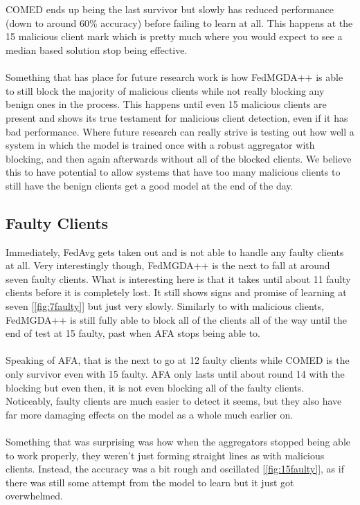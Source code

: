 \\ \\
COMED ends up being the last survivor but slowly has reduced performance (down to around 60\% accuracy) before failing to learn at all.
This happens at the 15 malicious client mark which is pretty much where you would expect to see a median based solution stop being effective.
\\ \\
Something that has place for future research work is how FedMGDA++ is able to still block the majority of malicious clients while not really blocking any benign ones in the process.
This happens until even 15 malicious clients are present and shows its true testament for malicious client detection, even if it has bad performance.
Where future research can really strive is testing out how well a system in which the model is trained once with a robust aggregator with blocking, and then again afterwards without all of the blocked clients.
We believe this to have potential to allow systems that have too many malicious clients to still have the benign clients get a good model at the end of the day.


\subsection{Faulty Clients}
Immediately, FedAvg gets taken out and is not able to handle any faulty clients at all.
Very interestingly though, FedMGDA++ is the next to fall at around seven faulty clients.
What is interesting here is that it takes until about 11 faulty clients before it is completely lost.
It still shows signs and promise of learning at seven [\ref{fig:7faulty}] but just very slowly.
Similarly to with malicious clients, FedMGDA++ is still fully able to block all of the clients all of the way until the end of test at 15 faulty, past when AFA stops being able to.
\\ \\
Speaking of AFA, that is the next to go at 12 faulty clients while COMED is the only survivor even with 15 faulty.
AFA only lasts until about round 14 with the blocking but even then, it is not even blocking all of the faulty clients.
Noticeably, faulty clients are much easier to detect it seems, but they also have far more damaging effects on the model as a whole much earlier on.
\\ \\
Something that was surprising was how when the aggregators stopped being able to work properly, they weren't just forming straight lines as with malicious clients.
Instead, the accuracy was a bit rough and oscillated [\ref{fig:15faulty}], as if there was still some attempt from the model to learn but it just got overwhelmed.


